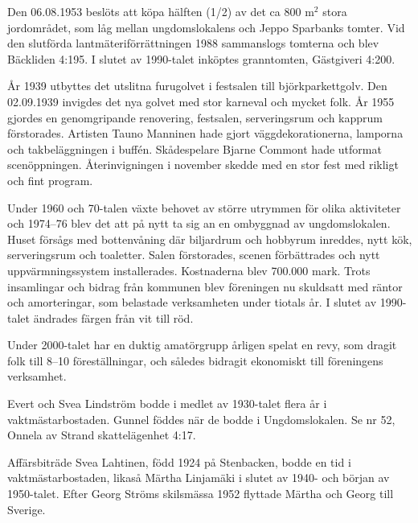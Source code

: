 
Den 06.08.1953 beslöts att köpa hälften (1/2) av det ca 800 m$^2$ stora jordområdet, som låg mellan ungdomslokalens och Jeppo Sparbanks tomter. Vid den slutförda lantmäteriförrättningen 1988 sammanslogs tomterna och blev Bäckliden 4:195. I slutet av 1990-talet inköptes granntomten, Gästgiveri 4:200.

År 1939 utbyttes det utslitna furugolvet i festsalen till björkparkettgolv. Den 02.09.1939 invigdes det nya golvet med stor karneval och mycket folk. År 1955 gjordes en genomgripande renovering, festsalen, serveringsrum och kapprum förstorades. Artisten Tauno Manninen hade gjort väggdekorationerna, lamporna och takbeläggningen i buffén. Skådespelare Bjarne Commont hade utformat scenöppningen. Återinvigningen i november skedde med en stor fest med rikligt och fint program.


Under 1960 och 70-talen växte behovet av större utrymmen för olika aktiviteter och 1974--76 blev det att på nytt ta sig an en ombyggnad av ungdomslokalen. Huset försågs med bottenvåning där biljardrum och hobbyrum inreddes, nytt kök, serveringsrum och toaletter. Salen förstorades, scenen förbättrades och nytt uppvärmningssystem installerades. Kostnaderna blev 700.000 mark. Trots insamlingar och bidrag från kommunen blev föreningen nu skuldsatt med räntor och amorteringar, som belastade verksamheten under tiotals år. I slutet av 1990-talet ändrades färgen från vit till röd.

Under 2000-talet har en duktig amatörgrupp årligen spelat en revy, som dragit folk till 8--10 föreställningar, och således bidragit ekonomiskt till föreningens verksamhet.

Evert och Svea Lindström bodde i medlet av 1930-talet flera år i vaktmästarbostaden. Gunnel föddes när de bodde i Ungdomslokalen. Se nr 52, Onnela av Strand skattelägenhet 4:17.

Affärsbiträde Svea Lahtinen, född 1924 på Stenbacken, bodde en tid i vaktmästarbostaden, likaså Märtha Linjamäki i slutet av 1940- och början av 1950-talet. Efter Georg Ströms skilsmässa 1952 flyttade Märtha och Georg till Sverige.


%

